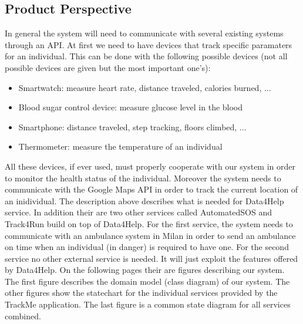 \documentclass[12pt]{article}
\begin{document}
\subsection{Product Perspective}
In general the system will need to communicate with several existing systems through an API. At first we need to have devices that track specific paramaters for an individual. This can be done with the following possible devices (not all possible devices are given but the most important one's): 
\begin{itemize}
    \item Smartwatch: measure heart rate, distance traveled, calories burned, ...
    \item Blood sugar control device: measure glucose level in the blood
    \item Smartphone: distance traveled, step tracking, floors climbed, ...
    \item Thermometer: measure the temperature of an individual
\end{itemize}
All these devices, if ever used, must properly cooperate with our system in order to monitor the health status of the individual. Moreover the system needs to communicate with the Google Maps API in order to track the current location of an inidividual.
The description above describes what is needed for Data4Help service. In addition their are two other services called AutomatedSOS and Track4Run build on top of Data4Help. For the first service, the system needs to communicate with an ambulance system in Milan in order to send an ambulance on time when an individual (in danger) is required to have one. For the second service no other external service is needed. It will just exploit the features offered by Data4Help.
    \vspace{5mm}
    \newline
    On the following pages their are figures describing our system. The first figure describes the domain model (class diagram) of our system. The other figures show the statechart for the individual services provided by the TrackMe application. The last figure is a common state diagram for all services combined.
\end{document}
